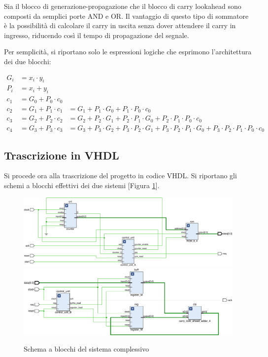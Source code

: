 Sia il blocco di generazione-propagazione che il blocco di carry lookahead sono composti da semplici porte AND e OR. Il vantaggio di questo tipo di sommatore è la possibilità di calcolare il carry in uscita senza dover attendere il carry in ingresso, riducendo così il tempo di propagazione del segnale.

Per semplicità, si riportano solo le espressioni logiche che esprimono l'architettura dei due blocchi:

\begin{align*}
    G_i &= x_i \cdot y_i \\
    P_i &= x_i + y_i \\
    c_1 &= G_0 + P_0 \cdot c_0 \\
    c_2 &= G_1 + P_1 \cdot c_1 &= G_1 + P_1 \cdot G_0 + P_1 \cdot P_0 \cdot c_0 \\
    c_3 &= G_2 + P_2 \cdot c_2 &= G_2 + P_2 \cdot G_1 + P_2 \cdot P_1 \cdot G_0 + P_2 \cdot P_1 \cdot P_0 \cdot c_0 \\
    c_4 &= G_3 + P_3 \cdot c_3 &= G_3 + P_3 \cdot G_2 + P_3 \cdot P_2 \cdot G_1 + P_3 \cdot P_2 \cdot P_1 \cdot G_0 + P_3 \cdot P_2 \cdot P_1 \cdot P_0 \cdot c_0
\end{align*}

\subsection{Trascrizione in VHDL}
Si procede ora alla trascrizione del progetto in codice VHDL. Si riportano gli schemi a blocchi effettivi dei due sistemi [Figura \ref{fig:12_DECEMBER_EXAM}].

\begin{figure}[h]
    \includegraphics[width=\linewidth]{img/12_DECEMBER_EXAM_A.pdf}
    \includegraphics[width=\linewidth]{img/12_DECEMBER_EXAM_B.pdf}
    \caption{Schema a blocchi del sistema complessivo}
    \label{fig:12_DECEMBER_EXAM}
\end{figure}

